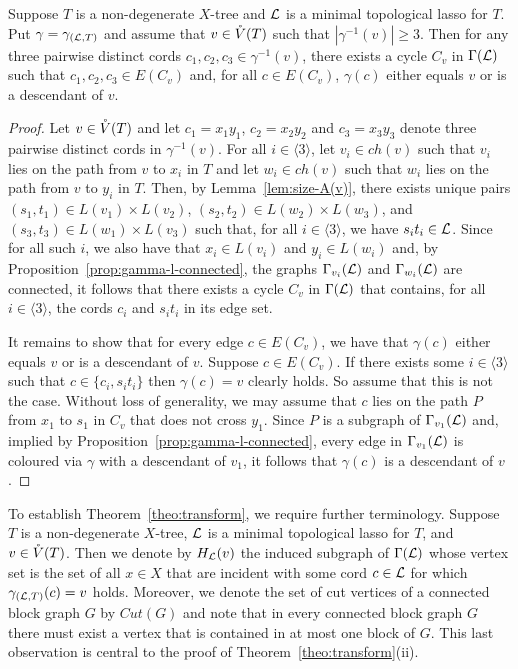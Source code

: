 \begin{lem}
  \label{lem:3-edges-cycle}
  Suppose $T$ is a non-degenerate $X$-tree and ${\mathcal L}$ is a minimal topological
  lasso for $T$.  Put $\gamma=\gamma_{({\mathcal L},T)}$ and assume that $v\in \mathring{V}(T)$
  such that $|\gamma^{-1}(v)|\geq 3 $. Then for any three pairwise distinct
  cords $c_1,c_2,c_3\in \gamma^{-1}(v)$, there exists a cycle $C_v$ in
  $\Gamma({\mathcal L})$ such that $c_1,c_2,c_3\in E(C_v)$ and, for all $c\in E(C_v)$,
  $\gamma(c)$ either equals $v$ or is a descendant of $v$.
\end{lem}
\begin{proof}
  Let $v\in \mathring{V}(T)$ and let $c_1=x_1y_1$, $c_2=x_2y_2$ and $c_3=x_3y_3$ denote
  three pairwise distinct cords in $\gamma^{-1}(v)$.  For all $i\in\langle
  3\rangle$, let $v_i\in ch(v) $ such that $v_i$ lies on the path from $v$ to
  $x_i$ in $T$ and let $w_i\in ch(v)$ such that $w_i$ lies on the path from
  $v$ to $y_i$ in $T$.  Then, by Lemma~\ref{lem:size-A(v)}, there exists
  unique pairs $(s_1,t_1)\in L(v_1)\times L(v_2)$, $(s_2,t_2)\in L(w_2)\times
  L(w_3)$, and $(s_3,t_3)\in L(w_1)\times L(v_3)$ such that, for all
  $i\in\langle 3\rangle$, we have $s_it_i\in {\mathcal L}$.  Since for all such $i$, we
  also have that $x_i\in L(v_i)$ and $y_i\in L(w_i)$ and, by
  Proposition~\ref{prop:gamma-l-connected}, the graphs $\Gamma_{v_i}({\mathcal L})$ and
  $\Gamma_{w_i}({\mathcal L})$ are connected, it follows that there exists a cycle
  $C_v$ in $\Gamma({\mathcal L})$ that contains, for all $i\in\langle 3\rangle$, the
  cords $c_i$ and $s_it_i$ in its edge set.

  It remains to show that for every edge $c\in E(C_v)$, we have that
  $\gamma(c)$ either equals $v$ or is a descendant of $v$.  Suppose $c\in
  E(C_v)$.  If there exists some $i\in\langle 3\rangle$ such that
  $c\in\{c_i,s_it_i\}$ then $\gamma (c)=v$ clearly holds. So assume that this
  is not the case. Without loss of generality, we may assume that $c$ lies on
  the path $P$ from $x_1$ to $s_1$ in $C_v$ that does not cross $y_1$. Since
  $P$ is a subgraph of $\Gamma_{v_1}({\mathcal L})$ and, implied by
  Proposition~\ref{prop:gamma-l-connected}, every edge in $\Gamma_{v_1}({\mathcal L})$
  is coloured via $\gamma$ with a descendant of $v_1$, it follows that
  $\gamma(c)$ is a descendant of $v$.
\end{proof}

To establish Theorem~\ref{theo:transform}, we require further terminology.
Suppose $T$ is a non-degenerate $X$-tree, ${\mathcal L}$ is a minimal topological lasso
for $T$, and $v\in \mathring{V}(T)$.  Then we denote by $H_{{\mathcal L}}(v)$ the induced
subgraph of $\Gamma({\mathcal L})$ whose vertex set is the set of all $x\in X$ that are
incident with some cord $c\in {\mathcal L}$ for which $\gamma_{({\mathcal L},T)}(c)=v$ holds.
Moreover, we denote the set of cut vertices of a connected block graph $G$ by
$Cut(G)$ and note that in every connected block graph $G$ there must exist a
vertex that is contained in at most one block of $G$. This last observation is
central to the proof of Theorem~\ref{theo:transform}(ii).

